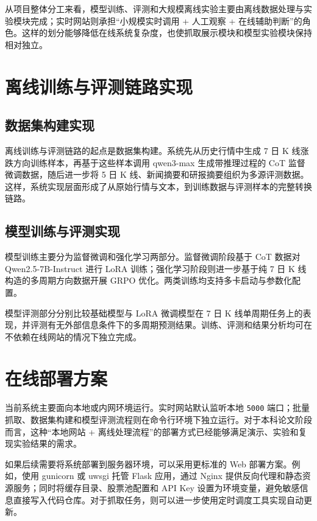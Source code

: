 从项目整体分工来看，模型训练、评测和大规模离线实验主要由离线数据处理与实验模块完成；实时网站则承担“小规模实时调用 + 人工观察 + 在线辅助判断”的角色。这样的划分能够降低在线系统复杂度，也使抓取展示模块和模型实验模块保持相对独立。

\section{离线训练与评测链路实现}

\subsection{数据集构建实现}

离线训练与评测链路的起点是数据集构建。系统先从历史行情中生成 7 日 K 线涨跌方向训练样本，再基于这些样本调用 qwen3-max 生成带推理过程的 CoT 监督微调数据，随后进一步将 5 日 K 线、新闻摘要和研报摘要组织为多源评测数据。这样，系统实现层面形成了从原始行情与文本，到训练数据与评测样本的完整转换链路。

\subsection{模型训练与评测实现}

模型训练主要分为监督微调和强化学习两部分。监督微调阶段基于 CoT 数据对 Qwen2.5-7B-Instruct 进行 LoRA 训练；强化学习阶段则进一步基于纯 7 日 K 线构造的多周期方向数据开展 GRPO 优化。两类训练均支持多卡启动与参数化配置。

模型评测部分分别比较基础模型与 LoRA 微调模型在 7 日 K 线单周期任务上的表现，并评测有无外部信息条件下的多周期预测结果。训练、评测和结果分析均可在不依赖在线网站的情况下独立完成。

\section{在线部署方案}

当前系统主要面向本地或内网环境运行。实时网站默认监听本地 \texttt{5000} 端口；批量抓取、数据集构建和模型评测流程则在命令行环境下独立运行。对于本科论文阶段而言，这种“本地网站 + 离线处理流程”的部署方式已经能够满足演示、实验和复现实验结果的需求。

如果后续需要将系统部署到服务器环境，可以采用更标准的 Web 部署方案。例如，使用 gunicorn 或 uwsgi 托管 Flask 应用，通过 Nginx 提供反向代理和静态资源服务；同时将缓存目录、股票池配置和 API Key 设置为环境变量，避免敏感信息直接写入代码仓库。对于抓取任务，则可以进一步使用定时调度工具实现自动更新。

